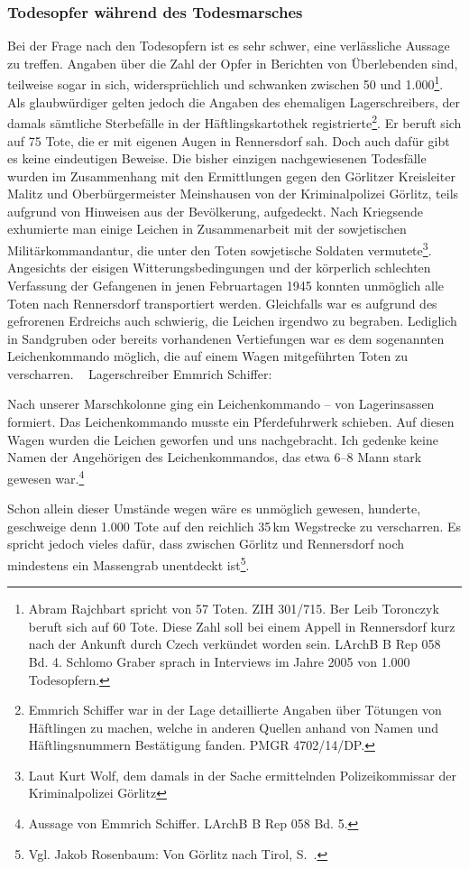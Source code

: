 \subsubsection{Todesopfer während des Todesmarsches}
Bei der Frage nach den Todesopfern ist es sehr schwer, eine verlässliche Aussage zu treffen. Angaben über die Zahl der Opfer in Berichten von Überlebenden sind, teilweise sogar in sich, widersprüchlich und schwanken zwischen 50 und 1.000\footnote{Abram Rajchbart spricht von 57 Toten. ZIH 301/715. Ber Leib Toronczyk beruft sich auf 60 Tote. Diese Zahl soll bei einem Appell in Rennersdorf kurz nach der Ankunft durch Czech verkündet worden sein. LArchB B Rep 058 Bd. 4. Schlomo Graber sprach in Interviews im Jahre 2005 von 1.000 Todesopfern.}. Als glaubwürdiger gelten jedoch die Angaben des ehemaligen Lagerschreibers, der damals sämtliche Sterbefälle in der Häftlingskartothek registrierte\footnote{Emmrich Schiffer war in der Lage detaillierte Angaben über Tötungen von Häftlingen zu machen, welche in anderen Quellen anhand von Namen und Häftlingsnummern Bestätigung fanden. PMGR 4702/14/DP.}. Er beruft sich auf 75 Tote, die er mit eigenen Augen in Rennersdorf sah. Doch auch dafür gibt es keine eindeutigen Beweise.
\newline
Die bisher einzigen nachgewiesenen Todesfälle wurden im Zusammenhang mit den Ermittlungen gegen den Görlitzer Kreisleiter Malitz und Oberbürgermeister Meinshausen von der Kriminalpolizei Görlitz, teils aufgrund von Hinweisen aus der Bevölkerung, aufgedeckt. Nach Kriegsende exhumierte man einige Leichen in Zusammenarbeit mit der sowjetischen Militärkommandantur, die unter den Toten sowjetische Soldaten vermutete\footnote{Laut Kurt Wolf, dem damals in der Sache ermittelnden Polizeikommissar der Kriminalpolizei Görlitz}. 
\newline
Angesichts der eisigen Witterungsbedingungen und der körperlich schlechten Verfassung der Gefangenen in jenen Februartagen 1945 konnten unmöglich alle Toten nach Rennersdorf transportiert werden. Gleichfalls war es aufgrund des gefrorenen Erdreichs auch schwierig, die Leichen irgendwo zu begraben. Lediglich in Sandgruben oder bereits vorhandenen Vertiefungen war es dem sogenannten Leichenkommando möglich, die auf einem Wagen mitgeführten Toten zu verscharren.
~\newline
Lagerschreiber Emmrich Schiffer:
\begin{leftbar} 
Nach unserer Marschkolonne ging ein Leichenkommando -- von Lagerinsassen formiert. Das Leichenkommando musste ein Pferdefuhrwerk schieben. Auf diesen Wagen wurden die Leichen geworfen und uns nachgebracht. 
Ich gedenke keine Namen der Angehörigen des Leichenkommandos, das etwa 6--8 Mann stark gewesen war.\footnote{Aussage von Emmrich Schiffer. LArchB B Rep 058 Bd. 5.} 
\end{leftbar}
Schon allein dieser Umstände wegen wäre es unmöglich gewesen, hunderte, geschweige denn 1.000 Tote auf den reichlich 35\,km Wegstrecke zu verscharren. Es spricht jedoch vieles dafür, dass zwischen Görlitz und Rennersdorf noch mindestens ein Massengrab unentdeckt ist\footnote{Vgl. Jakob Rosenbaum: Von Görlitz nach Tirol, S.~\pageref{rosenbaum}.}.

